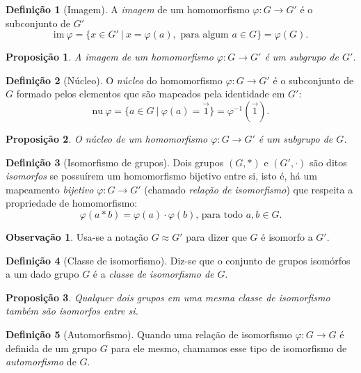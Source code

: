 \documentclass[a4paper,12pt]{report}
\theoremstyle{plain}
\newtheorem{proposicao}{Proposição}[section]
\theoremstyle{definition}
\newtheorem{definicao}{Definição}[section]
\newtheorem{observacao}{Observação}[section]
\begin{document}
\begin{definicao}[Imagem]
	A \emph{imagem} de um homomorfismo
	\(\varphi: G\longrightarrow G'\) é o subconjunto de \(G'\)	\[\text{im}\ \varphi = \{x\in G' \ |\ x = \varphi(a), \text{ para algum } a\in G\} = \varphi(G).\]
\end{definicao}

\begin{proposicao}
	A imagem de um homomorfismo $\varphi: G \longrightarrow G'$ é um subgrupo de $G'$.
\end{proposicao}

\begin{definicao}[Núcleo]
	O \emph{núcleo} do homomorfismo $\varphi: G \longrightarrow G'$ é o subconjunto de
	\(G\) formado pelos elementos que são mapeados pela identidade em
	\(G'\):	\[\text{nu} \ \varphi = \{a \in G \ | \ \varphi(a) = \vec{1}\} = \varphi^{-1}(\vec{1}).\]
\end{definicao}

\begin{proposicao}
	O núcleo de um homomorfismo $\varphi: G \longrightarrow G'$ é um subgrupo de $G$.
\end{proposicao}

\begin{definicao}[Isomorfismo de grupos]
	Dois grupos \((G,*)\) e \((G',\cdot)\) são ditos \emph{isomorfos} se possuírem um homomorfismo bijetivo entre si, isto é, há um mapeamento \emph{bijetivo} $\varphi: G \longrightarrow G'$ (chamado \emph{relação de isomorfismo}) que respeita a propriedade de homomorfismo:
	\[\varphi(a*b) = \varphi(a)\cdot\varphi(b) \text{, para todo } a,b \in G.\] 
\end{definicao}

\begin{observacao}
	Usa-se a notação $G \approx G'$ para dizer que $G$ é isomorfo a $G'$.  
\end{observacao}

\begin{definicao}[Classe de isomorfismo]
	Diz-se que o conjunto de grupos isomórfos a um dado grupo \(G\) é a \emph{classe de isomorfismo de \(G\)}.	
\end{definicao}

\begin{proposicao}
	Qualquer dois grupos em uma mesma classe de isomorfismo também são isomorfos entre si.
\end{proposicao}

\begin{definicao}[Automorfismo]
	Quando uma relação de isomorfismo \(\varphi: G\longrightarrow G\) é definida de um grupo \(G\) para ele mesmo,	chamamos esse tipo de isomorfismo de \emph{automorfismo} de \(G\).
\end{definicao}
\end{document}
